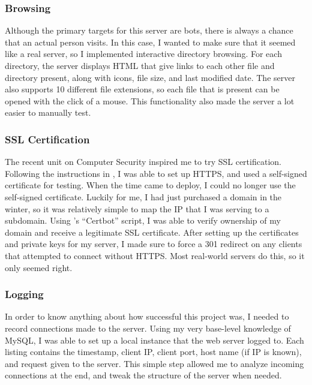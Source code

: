 \documentclass[12pt]{article}
\begin{document}
\subsubsection{Browsing}
Although the primary targets for this server are bots, there is always a chance that an actual person visits.
In this case, I wanted to make sure that it seemed like a real server, so I implemented interactive directory browsing.
For each directory, the server displays HTML that give links to each other file and directory present, along with icons, file size, and last modified date.
The server also supports 10 different file extensions, so each file that is present can be opened with the click of a mouse.
This functionality also made the server a lot easier to manually test.

\subsubsection{SSL Certification}
The recent unit on Computer Security inspired me to try SSL certification.
Following the instructions in , I was able to set up HTTPS, and used a self-signed certificate for testing.
When the time came to deploy, I could no longer use the self-signed certificate.
Luckily for me, I had just purchased a domain in the winter, so it was relatively simple to map the IP that I was serving to a subdomain.
Using \textcite{letsencrypt}'s ``Certbot'' script, I was able to verify ownership of my domain and receive a legitimate SSL certificate.
After setting up the certificates and private keys for my server, I made sure to force a 301 redirect on any clients that attempted to connect without HTTPS.
Most real-world servers do this, so it only seemed right.

\subsubsection{Logging}
In order to know anything about how successful this project was, I needed to record connections made to the server.
Using my very base-level knowledge of MySQL, I was able to set up a local instance that the web server logged to.
Each listing contains the timestamp, client IP, client port, host name (if IP is known), and request given to the server.
This simple step allowed me to analyze incoming connections at the end, and tweak the structure of the server when needed.
\end{document}

